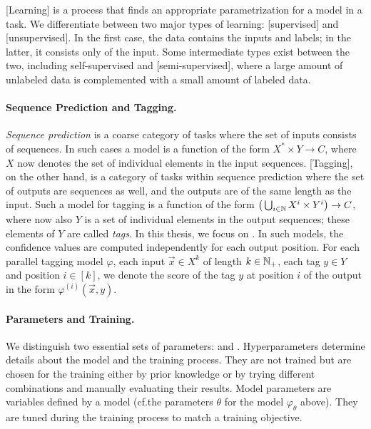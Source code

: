 \documentclass[../document.tex]{subfiles}
\begin{document}
    [Learning] is a process that finds an appropriate parametrization for a model in a task.
    We differentiate between two major types of learning: [supervised] and [unsupervised].
    In the first case, the data contains the inputs and labels; in the latter, it consists only of the input.
    Some intermediate types exist between the two, including self-supervised and [semi-supervised], where a large amount of unlabeled data is complemented with a small amount of labeled data.

    \paragraph{Sequence Prediction and Tagging.}
    \emph{Sequence prediction} is a coarse category of tasks where the set of inputs consists of sequences.
    In such cases a model is a function of the form \(X^* \times Y \to C\), where \(X\) now denotes the set of individual elements in the input sequences.
    [Tagging], on the other hand, is a category of tasks within sequence prediction where the set of outputs are sequences as well, and the outputs are of the same length as the input.
    Such a model for tagging is a function of the form \(\big( \bigcup_{i \in \mathbb{N}} X^i \times Y^i \big) \to C\), where now also \(Y\) is a set of individual elements in the output sequences; these elements of \(Y\) are called \emph{tags}.
    In this thesis, we focus on .
    In such models, the confidence values are computed independently for each output position.
    For each parallel tagging model \(\varphi\), each input \(\vec{x} \in X^k\) of length \(k \in \mathbb{N}_+\), each tag \(y\in Y\) and position \(i \in [k]\), we denote the score of the tag \(y\) at position \(i\) of the output in the form \(\varphi^{(i)}(\vec{x}, y)\).

    \paragraph{Parameters and Training.}
    We distinguish two essential sets of parameters:  and .
    Hyperparameters determine details about the model and the training process. %
    They are not trained but are chosen for the training either by prior knowledge or by trying different combinations and manually evaluating their results.
    Model parameters are variables defined by a model (cf.\@ the parameters \(\theta\) for the model \(\varphi_{\theta}\) above). They are tuned during the training process to match a training objective.
\end{document}
